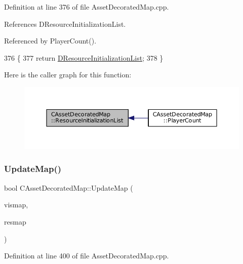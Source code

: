 Definition at line 376 of file Asset\+Decorated\+Map.\+cpp.



References D\+Resource\+Initialization\+List.



Referenced by Player\+Count().


\begin{DoxyCode}
376                                                                                                            
           \{
377     \textcolor{keywordflow}{return} \hyperlink{classCAssetDecoratedMap_ab4c78aeb90280ea98a3aa542cdb7f8cc}{DResourceInitializationList};
378 \}
\end{DoxyCode}
Here is the caller graph for this function\+:\nopagebreak
\begin{figure}[H]
\begin{center}
\leavevmode
\includegraphics[width=350pt]{classCAssetDecoratedMap_a279fb55e5536131b599275e8629d51cd_icgraph}
\end{center}
\end{figure}
\hypertarget{classCAssetDecoratedMap_a7b594b6bef2eed8bbb0e4e4e6b855903}{}\label{classCAssetDecoratedMap_a7b594b6bef2eed8bbb0e4e4e6b855903} 
\subsubsection{\texorpdfstring{Update\+Map()}{UpdateMap()}}
{\footnotesize\ttfamily bool C\+Asset\+Decorated\+Map\+::\+Update\+Map (\begin{DoxyParamCaption}\item[{const \hyperlink{classCVisibilityMap}{C\+Visibility\+Map} \&}]{vismap,  }\item[{const \hyperlink{classCAssetDecoratedMap}{C\+Asset\+Decorated\+Map} \&}]{resmap }\end{DoxyParamCaption})}



Definition at line 400 of file Asset\+Decorated\+Map.\+cpp.



